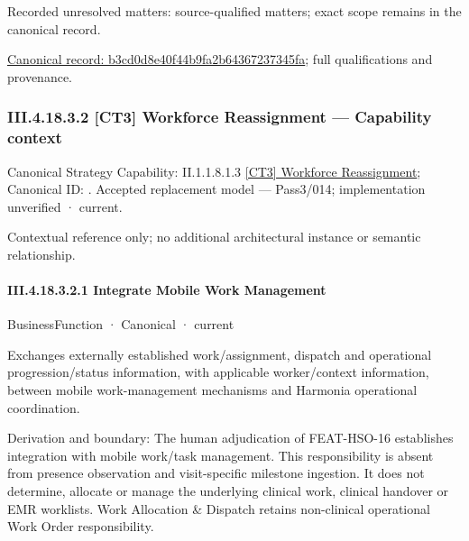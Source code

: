 {\small Recorded unresolved matters: source-qualified matters; exact scope remains in the canonical record.}\par
{\footnotesize \href{../../../../../../../../continuum/business/business-service/b3cd0d8e40f44b9fa2b64367237345fa.md}{Canonical record: b3cd0d8e40f44b9fa2b64367237345fa}; full qualifications and provenance.}\par
\subsubsection*{III.4.18.3.2 [CT3] Workforce Reassignment — Capability context}
\label{navigation:III.4.18.3.2}

{\small Canonical Strategy Capability: II.1.1.8.1.3 \hyperref[element:6e450d780ab54d129d5f648aa49edd2f]{[CT3] Workforce Reassignment}; Canonical ID: \texttt{}. Accepted replacement model — Pass3/014; implementation unverified · current.}\par
Contextual reference only; no additional architectural instance or semantic relationship.\par
\paragraph*{III.4.18.3.2.1 Integrate Mobile Work Management}
\label{navigation:III.4.18.3.2.1}

\label{element:81f97ad819da48f09f26029066550e08}
{\small BusinessFunction · Canonical · current}\par

Exchanges externally established work/assignment, dispatch and operational progression/status information, with applicable worker/context information, between mobile work-management mechanisms and Harmonia operational coordination.



Derivation and boundary: The human adjudication of FEAT-HSO-16 establishes integration with mobile work/task management. This responsibility is absent from presence observation and visit-specific milestone ingestion. It does not determine, allocate or manage the underlying clinical work, clinical handover or EMR worklists. Work Allocation \& Dispatch retains non-clinical operational Work Order responsibility.


